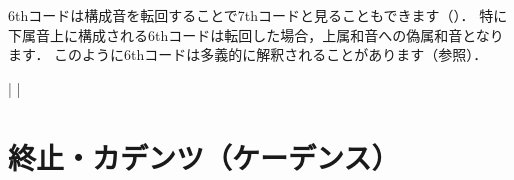 \documentclass[dvipdfmx,uplatex,b5paper,openany,jbase=12Q,nomag*,textwidth-limit=44%
               ]{gachimuchi}
\begin{document}
6thコードは構成音を転回することで7thコードと見ることもできます（）．
特に下属音上に構成される6thコードは転回した場合，上属和音への偽属和音となります．
このように6thコードは多義的に解釈されることがあります（参照）．

\begin{floatMusic}[pos=ht,width=0.5\linewidth]
  \nostartrule%
  \Startpiece%
  \Notes%
  \en\bar%
  \Notes%
  \en%
  \setdoublebar\changecontext%
  \Notes%
  \en\bar%
  \Notes%
  \en\setdoublebar%
  \endpiece
\end{floatMusic}




\chapter{終止・カデンツ（ケーデンス）}
\end{document}
